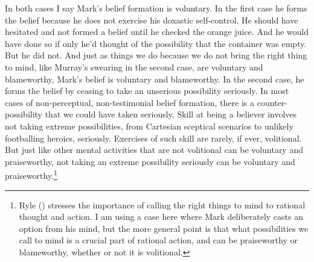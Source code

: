 \documentclass[
  11pt,
  letterpaper,
  DIV=11,
  numbers=noendperiod,
  twoside]{scrartcl}
\begin{document}
In both cases I say Mark's belief formation is voluntary. In the first
case he forms the belief because he does not exercise his doxastic
self-control. He should have hesitated and not formed a belief until he
checked the orange juice. And he would have done so if only he'd thought
of the possibility that the container was empty. But he did not. And
just as things we do because we do not bring the right thing to mind,
like Murray's swearing in the second case, are voluntary and
blameworthy, Mark's belief is voluntary and blameworthy. In the second
case, he forms the belief by ceasing to take an unserious possibility
seriously. In most cases of non-perceptual, non-testimonial belief
formation, there is a counter-possibility that we could have taken
seriously. Skill at being a believer involves not taking extreme
possibilities, from Cartesian sceptical scenarios to unlikely
footballing heroics, seriously. Exercises of such skill are rarely, if
ever, volitional. But just like other mental activities that are not
volitional can be voluntary and praiseworthy, not taking an extreme
possibility seriously can be voluntary and praiseworthy.\footnote{Ryle
  () stresses the importance of
  calling the right things to mind to rational thought and action. I am
  using a case here where Mark deliberately casts an option from his
  mind, but the more general point is that what possibilities we call to
  mind is a crucial part of rational action, and can be praiseworthy or
  blameworthy, whether or not it is volitional.}
\end{document}
